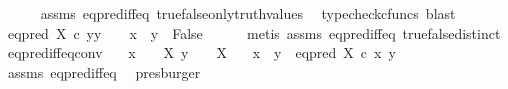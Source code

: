 \begin{isabellebody}
\ \ \ \ \isamarkupfalse%
\ assms\ eq{\isacharunderscore}{\kern0pt}pred{\isacharunderscore}{\kern0pt}iff{\isacharunderscore}{\kern0pt}eq\ true{\isacharunderscore}{\kern0pt}false{\isacharunderscore}{\kern0pt}only{\isacharunderscore}{\kern0pt}truth{\isacharunderscore}{\kern0pt}values\ \isamarkupfalse%
\ {\isacharparenleft}{\kern0pt}typecheck{\isacharunderscore}{\kern0pt}cfuncs{\isacharcomma}{\kern0pt}\ blast{\isacharparenright}{\kern0pt}\isanewline
{}\isamarkupfalse%
\isanewline
\ \ \isamarkupfalse%
\ {\isachardoublequoteopen}eq{\isacharunderscore}{\kern0pt}pred\ X\ {\isasymcirc}\isactrlsub c\ {\isasymlangle}y{\isacharcomma}{\kern0pt}y{\isasymrangle}\ {\isacharequal}{\kern0pt}\ {\isasymf}\ {\isasymLongrightarrow}\ x\ {\isacharequal}{\kern0pt}\ y\ {\isasymLongrightarrow}\ False{\isachardoublequoteclose}\isanewline
\ \ \ \ \isamarkupfalse%
\ {\isacharparenleft}{\kern0pt}metis\ assms{\isacharparenleft}{\kern0pt}{}{\isacharparenright}{\kern0pt}\ eq{\isacharunderscore}{\kern0pt}pred{\isacharunderscore}{\kern0pt}iff{\isacharunderscore}{\kern0pt}eq\ true{\isacharunderscore}{\kern0pt}false{\isacharunderscore}{\kern0pt}distinct{\isacharparenright}{\kern0pt}\isanewline
{}\isamarkupfalse%
%
\endisatagproof
{\isafoldproof}%
%
\isadelimproof
\isanewline
%
\endisadelimproof
\isanewline
{}\isamarkupfalse%
\ eq{\isacharunderscore}{\kern0pt}pred{\isacharunderscore}{\kern0pt}iff{\isacharunderscore}{\kern0pt}eq{\isacharunderscore}{\kern0pt}conv{}{\isacharcolon}{\kern0pt}\isanewline
\ \ \ {\isachardoublequoteopen}x\ {\isacharcolon}{\kern0pt}\ {\isasymone}\ {\isasymrightarrow}\ X{\isachardoublequoteclose}\ {\isachardoublequoteopen}y\ {\isacharcolon}{\kern0pt}\ {\isasymone}\ {\isasymrightarrow}\ X{\isachardoublequoteclose}\isanewline
\ \ \ {\isachardoublequoteopen}{\isacharparenleft}{\kern0pt}x\ {\isasymnoteq}\ y{\isacharparenright}{\kern0pt}\ {\isacharequal}{\kern0pt}\ {\isacharparenleft}{\kern0pt}eq{\isacharunderscore}{\kern0pt}pred\ X\ {\isasymcirc}\isactrlsub c\ {\isasymlangle}x{\isacharcomma}{\kern0pt}\ y{\isasymrangle}\ {\isasymnoteq}\ {\isasymt}{\isacharparenright}{\kern0pt}{\isachardoublequoteclose}\isanewline
%
\isadelimproof
\ \ %
\endisadelimproof
%
\isatagproof
{}\isamarkupfalse%
\ assms\ eq{\isacharunderscore}{\kern0pt}pred{\isacharunderscore}{\kern0pt}iff{\isacharunderscore}{\kern0pt}eq\ \isamarkupfalse%
\ presburger%
\endisatagproof
{\isafoldproof}%
%
\isadelimproof

\end{isabellebody}
